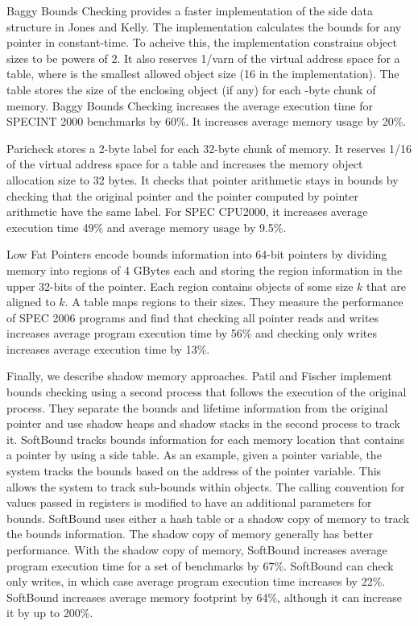 Baggy Bounds Checking \cite{Akritidis2008} provides a faster implementation
of the side data structure in Jones and Kelly.  The implementation 
calculates the bounds for any pointer in constant-time.   To acheive this,
the implementation constrains object sizes to be powers of 2.  It also reserves 
1/var{n} of the virtual address space for a table, where  is the smallest 
allowed object size (16 in the implementation).  The table stores the size of the
enclosing object (if any) for each -byte chunk of memory.   Baggy Bounds 
Checking increases the average execution time for SPECINT 2000 benchmarks by 60\%. 
It increases average memory usage by 20\%.

Paricheck \cite{Younan2010} stores a 2-byte label for each 32-byte chunk of memory.
It reserves 1/16 of the virtual address space for a table and increases
the memory object allocation size to 32 bytes.
It checks that pointer arithmetic stays in bounds by checking that the
original pointer and the pointer computed by pointer arithmetic have the
same label. For SPEC CPU2000, it increases average execution time 49\% and
average  memory usage by 9.5\%.

Low Fat Pointers \cite{Duck2016} encode bounds information into 64-bit pointers by
dividing memory into  regions of 4 GBytes each and storing
the region information in the upper 32-bits of the pointer.  Each
region contains objects of some size $k$ that are aligned to $k$.
A table maps regions to their sizes.  They measure the performance of 
SPEC 2006 programs and find that checking all pointer reads and writes
increases average program execution time by 56\% and checking only writes 
increases average execution time by 13\%.

Finally, we describe shadow memory approaches.
Patil and Fischer \cite{Patil1997}
implement bounds checking using a second process that follows the execution 
of the original process.  They separate the bounds and lifetime information
from the original pointer and use shadow heaps and shadow stacks in the
second process to track it.  
SoftBound \cite{Nagarakatte2009} tracks bounds information
for each  memory location that contains a pointer by using a side table.  
As an example, given a pointer variable,
the system tracks the bounds based on the address of the pointer variable.
This allows the system to track sub-bounds within objects.  The calling
convention for values passed in registers is modified to have an additional
parameters for bounds.  SoftBound uses either a hash table or
a shadow copy of memory to track the bounds information.   The shadow
copy of memory generally has better performance.  With the shadow
copy of memory, SoftBound increases average program execution time for
a set of benchmarks by 67\%.   SoftBound can check only writes, in which
case average program execution time increases by 22\%.   SoftBound increases 
average memory footprint by 64\%, although it can increase it by up to 200\%.

